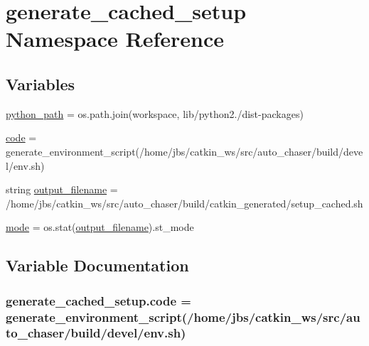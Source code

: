 \hypertarget{namespacegenerate__cached__setup}{}\section{generate\+\_\+cached\+\_\+setup Namespace Reference}
\label{namespacegenerate__cached__setup}
\subsection*{Variables}
\begin{DoxyCompactItemize}
\item 
\hyperlink{namespacegenerate__cached__setup_a72579fd01529a79bab20d99291889d3f}{python\+\_\+path} = os.\+path.\+join(workspace, \textquotesingle{}lib/python2./dist-\/packages\textquotesingle{})
\item 
\hyperlink{namespacegenerate__cached__setup_a52601295006f2366a311c4453d8f2f2e}{code} = generate\+\_\+environment\+\_\+script(\textquotesingle{}/home/jbs/catkin\+\_\+ws/src/auto\+\_\+chaser/build/devel/env.\+sh\textquotesingle{})
\item 
string \hyperlink{namespacegenerate__cached__setup_a0265aee5075ee1eb701ff69c98ad6793}{output\+\_\+filename} = \textquotesingle{}/home/jbs/catkin\+\_\+ws/src/auto\+\_\+chaser/build/catkin\+\_\+generated/setup\+\_\+cached.\+sh\textquotesingle{}
\item 
\hyperlink{namespacegenerate__cached__setup_a10081e5abedae9bd46dd91202096e789}{mode} = os.\+stat(\hyperlink{namespacegenerate__cached__setup_a0265aee5075ee1eb701ff69c98ad6793}{output\+\_\+filename}).st\+\_\+mode
\end{DoxyCompactItemize}


\subsection{Variable Documentation}
\subsubsection[{\texorpdfstring{code}{code}}]{\setlength{\rightskip}{0pt plus 5cm}generate\+\_\+cached\+\_\+setup.\+code = generate\+\_\+environment\+\_\+script(\textquotesingle{}/home/jbs/catkin\+\_\+ws/src/auto\+\_\+chaser/build/devel/env.\+sh\textquotesingle{})}\hypertarget{namespacegenerate__cached__setup_a52601295006f2366a311c4453d8f2f2e}{}\label{namespacegenerate__cached__setup_a52601295006f2366a311c4453d8f2f2e}


